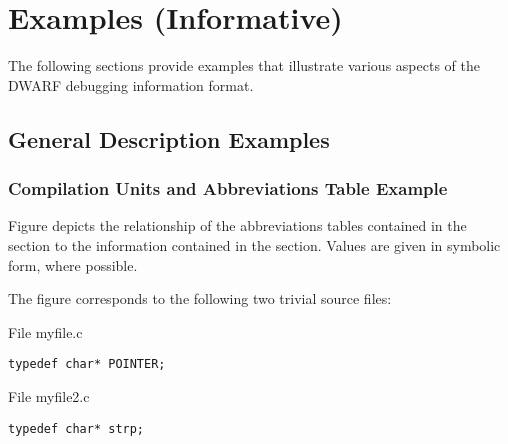 \chapter{Examples (Informative)}
\label{app:examplesinformative}

The following sections provide examples that illustrate
various aspects of the DWARF debugging information format.


\section{General Description Examples}
\label{app:generaldescriptionexamples}


\subsection{Compilation Units and Abbreviations Table Example}
\label{app:compilationunitsandabbreviationstableexample}

Figure 
depicts the relationship of the abbreviations tables contained
in the \dotdebugabbrev{}
section to the information contained in
the \dotdebuginfo{}
section. Values are given in symbolic form,
where possible.

The figure corresponds to the following two trivial source files:

File myfile.c
\begin{lstlisting}[numbers=none]
typedef char* POINTER;
\end{lstlisting}
File myfile2.c
\begin{lstlisting}[numbers=none]
typedef char* strp;
\end{lstlisting}

